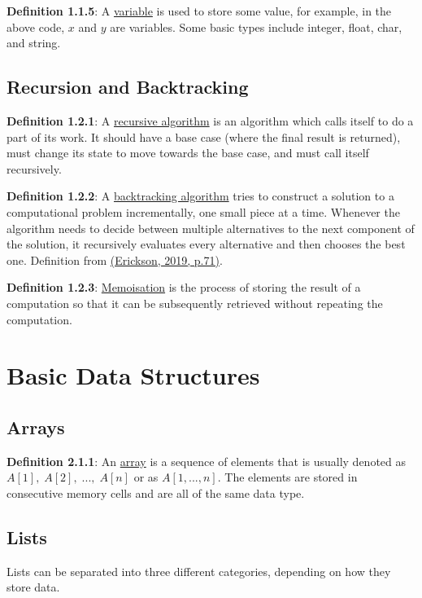 \documentclass{article}
\newcommand{\separate}[1] {\vspace{#1 pt}\noindent}
\newcommand{\definition}[2]{\textbf{Definition #1}: #2\label{def:#1}}
\begin{document}
\noindent\definition{1.1.5}{A \underline{variable} is used to store some value, for example, in the above code, \(x\) and \(y\) are variables. Some basic types include integer, float, char, and string.}

\subsection{Recursion and Backtracking}

\definition{1.2.1}{A \underline{recursive algorithm} is an algorithm which calls itself to do a part of its work. It should have a base case (where the final result is returned), must change its state to move towards the base case, and must call itself recursively.}

\separate{7}\definition{1.2.2}{A \underline{backtracking algorithm} tries to construct a solution to a computational problem incrementally, one small piece at a time. Whenever the algorithm needs to decide between multiple alternatives to the next component of the solution, it recursively evaluates every alternative and then chooses the best one.} Definition from \hyperref[cit:1.algorithms]{(Erickson, 2019, p.71)}.

\separate{7}\definition{1.2.3}{\underline{Memoisation} is the process of storing the result of a computation so that it can be subsequently retrieved without repeating the computation.}

\newpage\section{Basic Data Structures}

\subsection{Arrays}

\definition{2.1.1}{An \underline{array} is a sequence of elements that is usually denoted as \(A[1], \; A[2], \; ..., \; A[n]\) or as \(A[1,...,n]\).} The elements are stored in consecutive memory cells and are all of the same data type. 

\subsection{Lists}

Lists can be separated into three different categories, depending on how they store data. 
\end{document}
